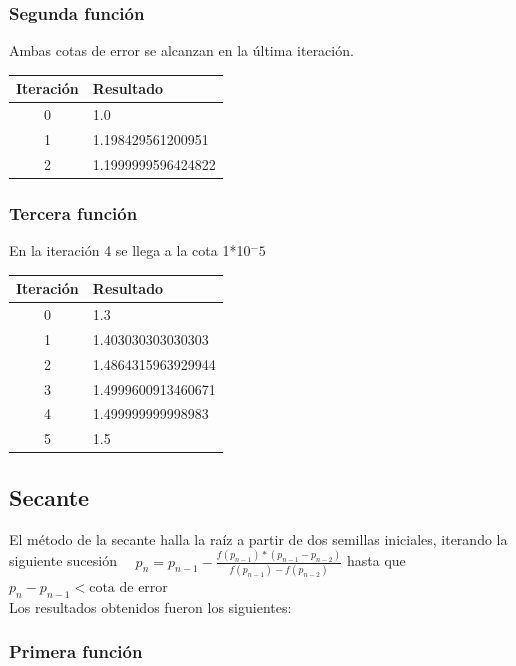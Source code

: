 \documentclass[titlepage,a4paper]{article}
\begin{document}
\subsubsection{Segunda función}\label{sec:NRM2}
Ambas cotas de error se alcanzan en la última iteración.
\begin{center}
    \begin{tabular}{| c | l |}
    \hline
     Iteración & Resultado \\ \hline
  0     &  1.0 \\
1     &  1.198429561200951 \\
2     &  1.1999999596424822 \\
    \hline
    \end{tabular}
\end{center}

\subsubsection{Tercera función}\label{sec:NRM3}
En la iteración 4 se llega a la cota 1*10$^-5$
\begin{center}
    \begin{tabular}{| c | l |}
    \hline
     Iteración & Resultado \\ \hline
          0     &  1.3 \\
        1     &  1.403030303030303 \\
        2     &  1.4864315963929944 \\
        3     &  1.4999600913460671 \\
        4     &  1.499999999998983 \\
        5     &  1.5 \\
    \hline
    \end{tabular}
\end{center}

\subsection{Secante}\label{sec:biseccion}
El método de la secante halla la raíz a partir de dos semillas iniciales, iterando la siguiente sucesión
$\quad p_{n} =p_{n-1}-\frac{f (p_{n-1})*(p_{n-1}-p_{n-2})}{f(p_{n-1})-f(p_{n-2})}$ hasta que $p_{n}-p_{n-1} < \mbox{cota de error}$
\\

Los resultados obtenidos fueron los siguientes:
\newpage
\subsubsection{Primera función}\label{sec:sec1}
\end{document}
